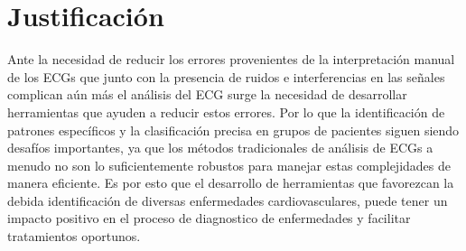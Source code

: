 \documentclass[spanish,11pt,letterpaper,oneside]{memoir}
\begin{document}
\section{Justificación}
	Ante la necesidad de reducir los errores provenientes de la interpretación manual de los ECGs que junto con la presencia de ruidos e interferencias en las señales complican aún más el análisis del ECG surge la necesidad de desarrollar herramientas que ayuden a reducir estos errores. Por lo que la identificación de patrones específicos y la clasificación precisa en grupos de pacientes siguen siendo desafíos importantes, ya que los métodos tradicionales de análisis de ECGs a menudo no son lo suficientemente robustos para manejar estas complejidades de manera eficiente. Es por esto que el desarrollo de herramientas que favorezcan la debida identificación de diversas enfermedades cardiovasculares, puede tener un impacto positivo en el proceso de diagnostico de enfermedades y facilitar tratamientos oportunos.
	
\end{document}
